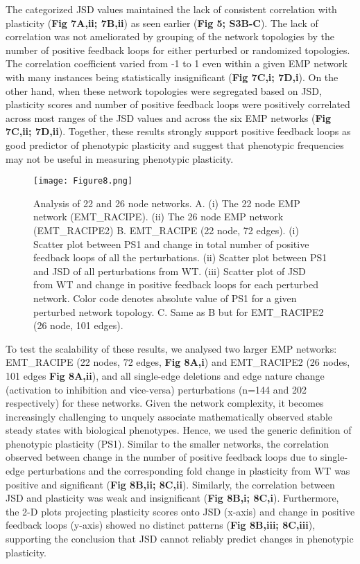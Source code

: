 \documentclass[preprint,review,12pt]{elsarticle}
\begin{document}
	The categorized JSD values maintained the lack of consistent correlation with plasticity (\textbf{Fig 7A,ii; 7B,ii}) as seen earlier (\textbf{Fig 5; S3B-C}). The lack of correlation was not ameliorated by grouping of the network topologies by the number of positive feedback loops for either perturbed or randomized topologies. The correlation coefficient varied from -1 to 1 even within a given EMP network with many instances being statistically insignificant (\textbf{Fig 7C,i; 7D,i}). On the other hand, when these network topologies were segregated based on JSD, plasticity scores and number of positive feedback loops were positively correlated across most ranges of the JSD values and across the six EMP networks (\textbf{Fig 7C,ii; 7D,ii}). Together, these results strongly support positive feedback loops as good predictor of phenotypic plasticity and suggest that phenotypic frequencies may not be useful in measuring phenotypic plasticity.
	\color{black} 
	
		\begin{figure}[!ht]
		\centering
		\texttt{[image: Figure8.png]}
		\caption{Analysis of 22 and 26 node networks.
		A. (i) The 22 node EMP network (EMT\_RACIPE). (ii) The 26 node EMP network (EMT\_RACIPE2)
		B. EMT\_RACIPE (22 node, 72 edges). (i) Scatter plot between PS1 and change in total number of positive feedback loops of all the perturbations.
		(ii) Scatter plot between PS1 and JSD of all perturbations from WT. 
		(iii) Scatter plot of JSD from WT and change in
positive feedback loops for each perturbed network.  Color code denotes absolute value of PS1 for a given perturbed
network topology.
C. Same as B but for EMT\_RACIPE2 (26 node, 101 edges). }
		\label{figure8}
	\end{figure}
	
	
	\color{red} To test the scalability of these results, we analysed two  larger EMP networks: EMT\_RACIPE \cite{Huang2016} (22 nodes, 72 edges, \textbf{Fig 8A,i}) and EMT\_RACIPE2 \cite{Font-Clos2018} (26 nodes, 101 edges \textbf{Fig 8A,ii}), and all single-edge deletions and edge nature change (activation to inhibition and vice-versa) perturbations (n=144 and 202 respectively) for these networks. Given the network complexity, it becomes increasingly challenging to unquely associate mathematically observed stable steady states with biological phenotypes. Hence, we used the generic definition of phenotypic plasticity (PS1). Similar to the smaller networks, the correlation observed between change in the number of positive feedback loops due to single-edge perturbations and the corresponding fold change in plasticity from WT was positive and significant (\textbf{Fig 8B,ii; 8C,ii}). Similarly, the correlation between JSD and plasticity was weak and insignificant (\textbf{Fig 8B,i; 8C,i}). Furthermore, the 2-D plots projecting plasticity scores onto JSD (x-axis) and change in positive feedback loops (y-axis) showed no distinct patterns (\textbf{Fig 8B,iii; 8C,iii}), supporting the conclusion that JSD cannot reliably predict changes in phenotypic plasticity. 
	
\end{document}
